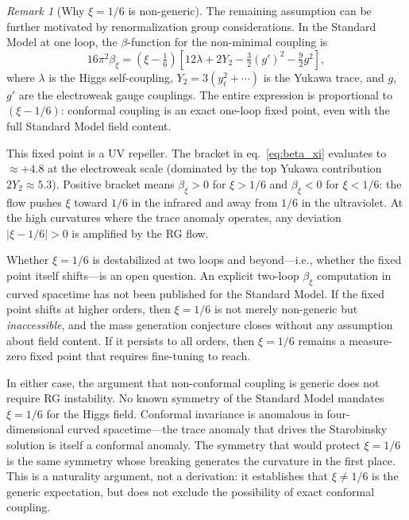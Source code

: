 \documentclass[12pt,a4paper]{article}
\theoremstyle{definition}
\theoremstyle{remark}
\newtheorem{remark}{Remark}
\begin{document}
\begin{remark}[Why $\xi = 1/6$ is non-generic]
\label{rem:xi_running}
The remaining assumption can be further motivated by
renormalization group considerations. In the Standard Model at one loop,
the $\beta$-function for the non-minimal coupling
is~\cite{markkanen_sm_curved}
\begin{equation}
16\pi^2 \beta_\xi = \left(\xi - \tfrac{1}{6}\right)
\left[12\lambda + 2Y_2 - \tfrac{3}{2}(g')^2 - \tfrac{9}{2}g^2\right],
\label{eq:beta_xi}
\end{equation}
where $\lambda$ is the Higgs self-coupling, $Y_2 = 3(y_t^2 + \cdots)$
is the Yukawa trace, and $g$, $g'$ are the electroweak gauge couplings.
The entire expression is proportional to $(\xi - 1/6)$: conformal
coupling is an exact one-loop fixed point, even with the full Standard
Model field content.

This fixed point is a UV repeller. The bracket in
eq.~\eqref{eq:beta_xi} evaluates to $\approx +4.8$ at the electroweak
scale (dominated by the top Yukawa contribution $2Y_2 \approx 5.3$).
Positive bracket means $\beta_\xi > 0$ for $\xi > 1/6$ and
$\beta_\xi < 0$ for $\xi < 1/6$: the flow pushes $\xi$ toward $1/6$ in
the infrared and away from $1/6$ in the ultraviolet. At the high
curvatures where the trace anomaly operates, any deviation
$|\xi - 1/6| > 0$ is amplified by the RG flow.

Whether $\xi = 1/6$ is destabilized at two loops and beyond---i.e.,
whether the fixed point itself shifts---is an open question. An explicit
two-loop $\beta_\xi$ computation in curved spacetime has not been
published for the Standard Model. If the fixed point shifts at higher
orders, then $\xi = 1/6$ is not merely non-generic but
\emph{inaccessible}, and the mass generation conjecture closes without
any assumption about field content. If it persists to all orders, then
$\xi = 1/6$ remains a measure-zero fixed point that requires
fine-tuning to reach.

In either case, the argument that non-conformal coupling is generic
does not require RG instability. No known symmetry of the Standard Model
mandates $\xi = 1/6$ for the Higgs field. Conformal invariance is
anomalous in four-dimensional curved spacetime---the trace anomaly that
drives the Starobinsky solution is itself a conformal anomaly. The
symmetry that would protect $\xi = 1/6$ is the same symmetry whose
breaking generates the curvature in the first place. This is a
naturality argument, not a derivation: it establishes that
$\xi \neq 1/6$ is the generic expectation, but does not exclude the
possibility of exact conformal coupling.
\end{remark}
\end{document}
